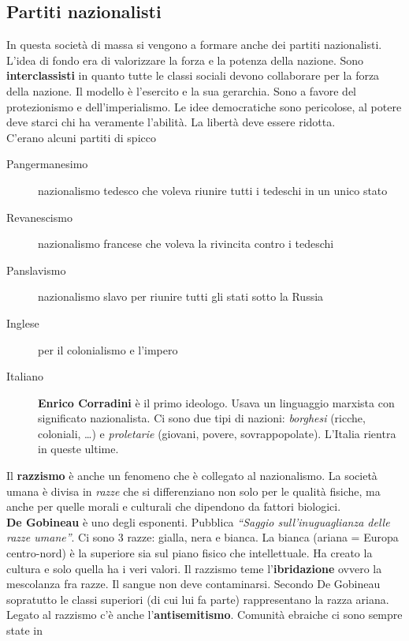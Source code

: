 \subsection{Partiti nazionalisti}
In questa società di massa si vengono a formare anche dei partiti nazionalisti. L'idea di fondo era
di valorizzare la forza e la potenza della nazione. Sono \textbf{interclassisti} in quanto tutte le
classi sociali devono collaborare per la forza della nazione. Il modello è l'esercito e la sua 
gerarchia. Sono a favore del protezionismo e dell'imperialismo. Le idee democratiche sono pericolose,
al potere deve starci chi ha veramente l'abilità. La libertà deve essere ridotta.\\
C'erano alcuni partiti di spicco
\begin{description}
  \item[Pangermanesimo] nazionalismo tedesco che voleva riunire tutti i tedeschi in un unico stato
  \item[Revanescismo] nazionalismo francese che voleva la rivincita contro i tedeschi
  \item[Panslavismo] nazionalismo slavo per riunire tutti gli stati sotto la Russia
  \item[Inglese] per il colonialismo e l'impero
  \item[Italiano] \textbf{Enrico Corradini} è il primo ideologo. Usava un linguaggio marxista con
    significato nazionalista. Ci sono due tipi di nazioni: \emph{borghesi} (ricche, coloniali, 
    \ldots) e \emph{proletarie} (giovani, povere, sovrappopolate). L'Italia rientra in queste ultime.
\end{description}
Il \textbf{razzismo} è anche un fenomeno che è collegato al nazionalismo. La società umana è divisa 
in \emph{razze} che si differenziano non solo per le qualità fisiche, ma anche per quelle morali e 
culturali che dipendono da fattori biologici.\\
\textbf{De Gobineau} è uno degli esponenti. Pubblica \emph{``Saggio sull'inuguaglianza delle razze
umane''}. Ci sono 3 razze: gialla, nera e bianca. La bianca (ariana = Europa centro-nord) è la
superiore sia sul piano fisico che intellettuale. Ha creato la cultura e solo quella ha i veri
valori. Il razzismo teme l'\textbf{ibridazione} ovvero la mescolanza fra razze. Il sangue non deve 
contaminarsi. Secondo De Gobineau sopratutto le classi superiori (di cui lui fa parte) rappresentano 
la razza ariana.\\
Legato al razzismo c'è anche l'\textbf{antisemitismo}. Comunità ebraiche ci sono sempre state in 
